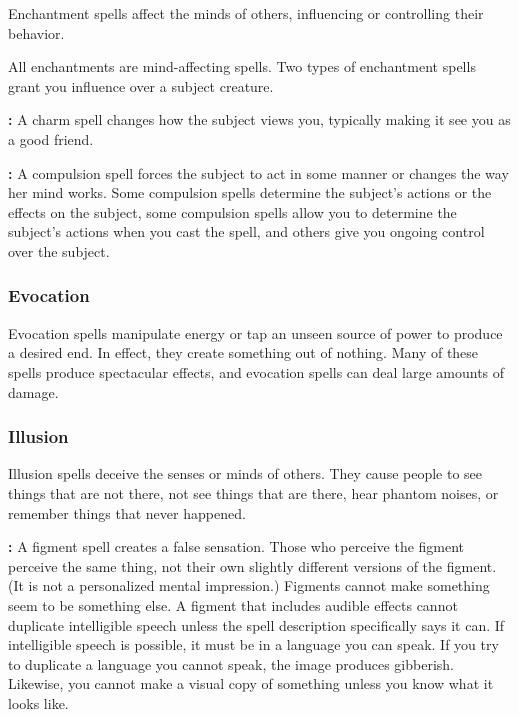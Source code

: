 Enchantment spells affect the minds of others, influencing or controlling their 
behavior.

All enchantments are mind-affecting spells. Two types of enchantment spells grant 
you influence over a subject creature.

\textbf{:} A charm spell changes how the subject views you, typically making 
it see you as a good friend.

\textbf{:} A compulsion spell forces the subject to act in some manner 
or changes the way her mind works. Some compulsion spells determine the subject's 
actions or the effects on the subject, some compulsion spells allow you to determine 
the subject's actions when you cast the spell, and others give you ongoing control 
over the subject.

\subsubsection{Evocation}

Evocation spells manipulate energy or tap an unseen source of power to produce 
a desired end. In effect, they create something out of nothing. Many of these spells 
produce spectacular effects, and evocation spells can deal large amounts of damage.

\subsubsection{Illusion}

Illusion spells deceive the senses or minds of others. They cause people to see 
things that are not there, not see things that are there, hear phantom noises, 
or remember things that never happened.

\textbf{:} A figment spell creates a false sensation. Those who perceive 
the figment perceive the same thing, not their own slightly different versions 
of the figment. (It is not a personalized mental impression.) Figments cannot make 
something seem to be something else. A figment that includes audible effects cannot 
duplicate intelligible speech unless the spell description specifically says it 
can. If intelligible speech is possible, it must be in a language you can speak. 
If you try to duplicate a language you cannot speak, the image produces gibberish. 
Likewise, you cannot make a visual copy of something unless you know what it looks 
like.

